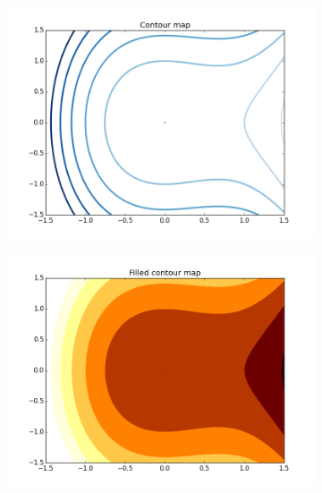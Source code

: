\begin{figure}[h]
\centering
\begin{subfigure}{.45\textwidth}
\centering
\includegraphics[width=\textwidth]{contour_map.png}
\end{subfigure}
\begin{subfigure}{.45\textwidth}
\centering
\includegraphics[width=\textwidth]{contour_map_filled.png}
\end{subfigure}
\begin{subfigure}{.45\textwidth}
\centering

\end{subfigure}
\end{figure}
